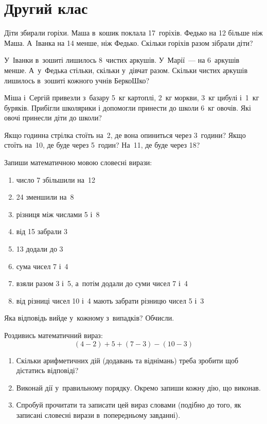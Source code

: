 \chapter{Другий клас}

\problem
Діти збирали горіхи. Маша в~кошик поклала 17~горіхів.
Федько на 12 більше ніж Маша. А~Іванка на 14 менше, ніж Федько.
Скільки горіхів разом зібрали діти?


\problem
У~Іванки в~зошиті лишилось 8~чистих аркушів.
У~Марії~--- на 6~аркушів менше.
А~у~Федька стільки, скільки у~дівчат разом.
Скільки чистих аркушів лишилось в~зошиті кожного учнів БеркоШко?


\problem
Міша і~Сергій привезли з~базару 5~кг картоплі, 2~кг моркви,
3~кг цибулі і~1~кг буряків.
Прибігли школярики і допомогли принести до школи 6~кг овочів.
Які овочі принесли діти до школи?


\problem
{}
Якщо годинна стрілка стоїть на~2, де вона опиниться через 3~години?
Якщо стоїть на~10, де буде через 5~годин?
На~11, де буде через 18?


\problem
Запиши математичною мовою словесні вирази:
\begin{enumerate}
    \item число 7 збільшили на~12
    \item 24 зменшили на~8
    \item різниця між числами 5 і~8
    \item від 15 забрали 3
    \item 13 додали до 3
    \item сума чисел 7 і~4
    \item взяли разом 3 і~5, а~потім додали до суми чисел 7 і~4
    \item від різниці чисел 10 і~4 мають забрати різницю чисел 5 і~3
\end{enumerate}
Яка відповідь вийде у~кожному з~випадків? Обчисли.


\problem
Роздивись математичний вираз:
\[
(4 - 2) + 5 + (7 - 3) - (10 - 3)
\]
\begin{enumerate}
    \item Скільки арифметичних дій (додавань та віднімань)
    треба зробити щоб дістатись відповіді?
    \item Виконай дії у~правильному порядку.
    Окремо запиши кожну дію, що виконав.
    \item Спробуй прочитати та записати цей вираз словами
    (подібно до того, як записані словесні вирази в~попередньому завданні).
\end{enumerate}


